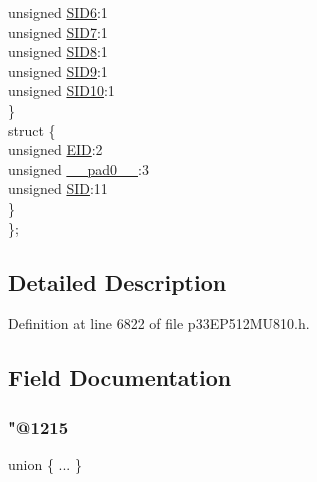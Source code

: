 \begin{DoxyCompactItemize}
\begin{tabbing}
\>\>unsigned \hyperlink{structtag_c2_r_x_f11_s_i_d_b_i_t_s_a70d70952133eb2389d5c326f9f0e8035}{SID6}:1\\
\>\>unsigned \hyperlink{structtag_c2_r_x_f11_s_i_d_b_i_t_s_a34097fb76decd431701fa2d86a22328e}{SID7}:1\\
\>\>unsigned \hyperlink{structtag_c2_r_x_f11_s_i_d_b_i_t_s_afe74894633244fdb0b0c01b4e8c522e7}{SID8}:1\\
\>\>unsigned \hyperlink{structtag_c2_r_x_f11_s_i_d_b_i_t_s_a33587704948067005c2a6a3ccc503c99}{SID9}:1\\
\>\>unsigned \hyperlink{structtag_c2_r_x_f11_s_i_d_b_i_t_s_a1a9084031c7f5fb16007feeebf0d8216}{SID10}:1\\
\>\} \\
\>struct \{\\
\>\>unsigned \hyperlink{structtag_c2_r_x_f11_s_i_d_b_i_t_s_ae80b378c9141f7c03e0b4e55b5f4b54d}{EID}:2\\
\>\>unsigned \hyperlink{structtag_c2_r_x_f11_s_i_d_b_i_t_s_adf71f3d8410c1f1dbbc96680a92c49af}{\_\_pad0\_\_}:3\\
\>\>unsigned \hyperlink{structtag_c2_r_x_f11_s_i_d_b_i_t_s_af88edf93b2fee2432665bd84f51287e4}{SID}:11\\
\>\} \\
\}; \\

\end{tabbing}\end{DoxyCompactItemize}


\subsection{Detailed Description}


Definition at line 6822 of file p33\+E\+P512\+M\+U810.\+h.



\subsection{Field Documentation}
\mbox{\label{structtag_c2_r_x_f11_s_i_d_b_i_t_s_a7553bd871cf4bfeff8dd140209c4fd19}} 
\subsubsection{\texorpdfstring{"@1215}{@1215}}
{\footnotesize\ttfamily union \{ ... \} }

\mbox{\label{structtag_c2_r_x_f11_s_i_d_b_i_t_s_adf71f3d8410c1f1dbbc96680a92c49af}} 
